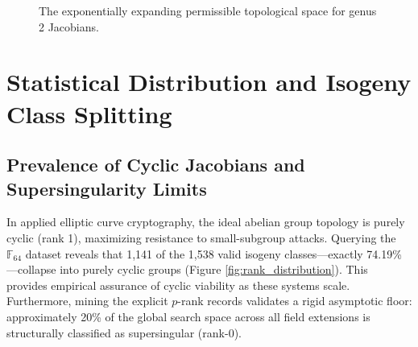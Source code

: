 \documentclass[letterpaper, 11pt]{article}
\begin{document}
	\begin{figure}[htpb]
		\centering
		\caption{The exponentially expanding permissible topological space for genus 2 Jacobians.}
		\label{fig:hasse_weil_bounds}
	\end{figure}
	
	\section{Statistical Distribution and Isogeny Class Splitting}
	
	\subsection{Prevalence of Cyclic Jacobians and Supersingularity Limits}
	In applied elliptic curve cryptography, the ideal abelian group topology is purely cyclic (rank 1), maximizing resistance to small-subgroup attacks. Querying the $\mathbb{F}_{64}$ dataset reveals that 1,141 of the 1,538 valid isogeny classes---exactly 74.19\%---collapse into purely cyclic groups (Figure \ref{fig:rank_distribution}). This provides empirical assurance of cyclic viability as these systems scale. Furthermore, mining the explicit $p$-rank records validates a rigid asymptotic floor: approximately 20\% of the global search space across all field extensions is structurally classified as supersingular (rank-0).
	
\end{document}
